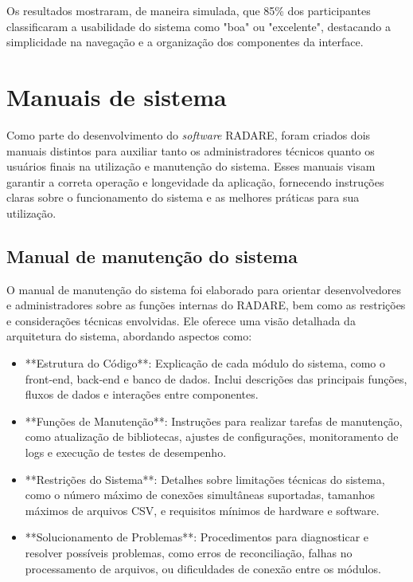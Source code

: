 Os resultados mostraram, de maneira simulada, que 85\% dos participantes classificaram a usabilidade do sistema como "boa" ou "excelente", destacando a simplicidade na navegação e a organização dos componentes da interface.

\section{Manuais de sistema}

Como parte do desenvolvimento do \textit{software} RADARE, foram criados dois manuais distintos para auxiliar tanto os administradores técnicos quanto os usuários finais na utilização e manutenção do sistema. Esses manuais visam garantir a correta operação e longevidade da aplicação, fornecendo instruções claras sobre o funcionamento do sistema e as melhores práticas para sua utilização.

\subsection{Manual de manutenção do sistema}

O manual de manutenção do sistema foi elaborado para orientar desenvolvedores e administradores sobre as funções internas do RADARE, bem como as restrições e considerações técnicas envolvidas. Ele oferece uma visão detalhada da arquitetura do sistema, abordando aspectos como:

\begin{itemize}
    \item **Estrutura do Código**: Explicação de cada módulo do sistema, como o front-end, back-end e banco de dados. Inclui descrições das principais funções, fluxos de dados e interações entre componentes.
    \item **Funções de Manutenção**: Instruções para realizar tarefas de manutenção, como atualização de bibliotecas, ajustes de configurações, monitoramento de logs e execução de testes de desempenho.
    \item **Restrições do Sistema**: Detalhes sobre limitações técnicas do sistema, como o número máximo de conexões simultâneas suportadas, tamanhos máximos de arquivos CSV, e requisitos mínimos de hardware e software.
    \item **Solucionamento de Problemas**: Procedimentos para diagnosticar e resolver possíveis problemas, como erros de reconciliação, falhas no processamento de arquivos, ou dificuldades de conexão entre os módulos.
\end{itemize}

